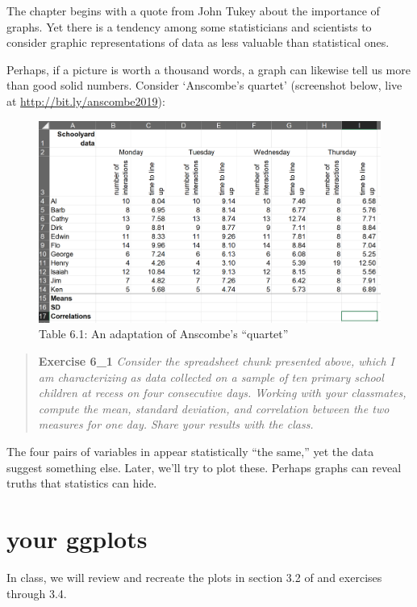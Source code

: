 \documentclass[
  openany]{book}
\begin{document}
The chapter begins with a quote from John Tukey about the importance of graphs. Yet there is a tendency among some statisticians and scientists to consider graphic representations of data as less valuable than statistical ones.

Perhaps, if a picture is worth a thousand words, a graph can likewise tell us more than good solid numbers. Consider `Anscombe's quartet' (screenshot below, live at \url{http://bit.ly/anscombe2019}):

\begin{figure}
\centering
\includegraphics{spreadsheet61.PNG}
\caption{Table 6.1: An adaptation of Anscombe's ``quartet'' \citep{anscombe1973american}}
\end{figure}

\begin{quote}
\textbf{Exercise 6\_1}
\emph{Consider the spreadsheet chunk presented above, which I am characterizing as data collected on a sample of ten primary school children at recess on four consecutive days. Working with your classmates, compute the mean, standard deviation, and correlation between the two measures for one day. Share your results with the class.}
\end{quote}

The four pairs of variables in \citet{anscombe1973american} appear statistically ``the same,'' yet the data suggest something else. Later, we'll try to plot these. Perhaps graphs can reveal truths that statistics can hide.

\hypertarget{your-ggplots}{%
\section{your ggplots}\label{your-ggplots}}

In class, we will review and recreate the plots in section 3.2 of \citet{wickham2016r} and exercises through 3.4.
\end{document}
